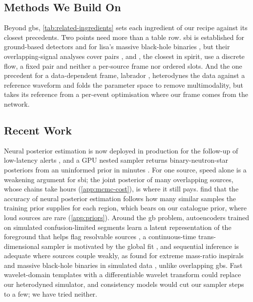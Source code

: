\subsection{Methods We Build On}
\label{app:related-methods}
Beyond \acp{gb}, \cref{tab:related-ingredients} sets each ingredient of our recipe against its
closest precedents. Two points need more than a table row. \Acs{sbi} is established
for ground-based detectors \citep{chua2020learning,green2020gravitational,green2021complete,gabbard2022bayesian,dax2021real,dax2025real}
and for \ac{lisa}'s massive black-hole binaries \citep{du2024advancing,liang2024rapid,spadaro2026accurate}, but
their overlapping-signal analyses cover pairs
\citep{langendorff2023normalizing,alvey2023crowded,papalini2025can}, and \citet{papalini2025can}, the
closest in spirit, use a discrete flow, a fixed pair and neither a per-source frame nor ordered
slots. And the one precedent for a data-dependent frame, labrador \citep{roulet2026domain}, heterodynes the data against
a reference waveform and folds the parameter space to remove multimodality, but takes its reference
from a per-event optimisation where our frame comes from the network.

\subsection{Recent Work}
\label{app:related-recent}
Neural posterior estimation is now deployed in production for the follow-up of low-latency alerts
\citep{marx2026likelihood}, and a GPU nested sampler returns binary-neutron-star posteriors from an
uninformed prior in minutes \citep{yallup2026abinitio}. For one source, speed alone is a weakening
argument for \acs{sbi}; the joint posterior of many overlapping sources, whose chains take hours
(\cref{app:mcmc-cost}), is where it still pays. \citet{kolmus2024tuning} find that the accuracy of
neural posterior estimation follows how many similar samples the training prior supplies for each
region, which bears on our catalogue prior, where loud sources are rare (\cref{app:priors}). Around
the \ac{gb} problem, autoencoders trained on simulated confusion-limited segments learn a latent
representation of the foreground that helps flag resolvable sources
\citep{cain2026manifold,cain2026global}, a continuous-time trans-dimensional sampler is motivated by
the global fit \citep{astorino2026samsara}, and sequential inference is adequate where sources
couple weakly, as found for extreme mass-ratio inspirals and massive black-hole binaries in
simulated data \citep{agrawal2026untangling}, unlike overlapping \acp{gb}. Fast wavelet-domain
templates \citep{cornish2026time} with a differentiable wavelet transform
\citep{vajpeyi2026explicit} could replace our heterodyned simulator, and consistency models
\citep{schmitt2024consistency} would cut our \FlowMatchingOdeSteps{} sampler steps to a few; we
have tried neither.
